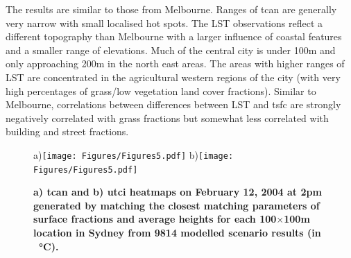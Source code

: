 \documentclass[final,3p,times,authoryear]{elsarticle}
\begin{document}
The results are similar to those from Melbourne. Ranges of \gls{tcan} are generally very narrow with small localised hot spots. The LST observations reflect a different topography than Melbourne with a larger influence of coastal features and a smaller range of elevations. Much of the central city is under 100m and only approaching 200m in the north east areas. The areas with higher ranges of LST are concentrated in the agricultural western regions of the city (with very high percentages of grass/low vegetation land cover fractions). Similar to Melbourne, correlations between differences between LST and \gls{tsfc} are strongly negatively correlated with grass fractions but somewhat less correlated with building and street fractions.




\begin{figure}
\centering
a)\texttt{[image: Figures/Figures5.pdf]}
b)\texttt{[image: Figures/Figures5.pdf]}
\caption{\bf a) \gls{tcan} and b) \gls{utci} heatmaps on February 12, 2004 at 2pm generated by matching the closest matching parameters of surface fractions and average heights for each 100$\times$100m location in Sydney from 9814 modelled scenario results (in \SI{}{\degreeCelsius}).  }
 \label{fig:TaSyd} \label{fig:utciSyd}
\end{figure}
\end{document}
